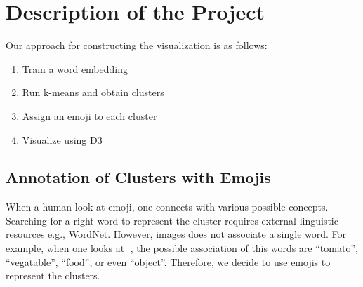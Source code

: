 \section{Description of the Project}
Our approach for constructing the visualization is as follows:
\begin{enumerate}
 \item Train a word embedding
 \item Run k-means and obtain clusters
 \item Assign an emoji to each cluster
 \item Visualize using D3
\end{enumerate}

\subsection{Annotation of Clusters with Emojis}
When a human look at emoji, one connects with various possible concepts. 
Searching for a right word to represent the cluster requires external linguistic resources e.g., WordNet. 
However, images does not associate a single word. 
For example, when one looks at 🍅, the possible association of this words are ``tomato'', ``vegatable'', ``food'', or even ``object''. 
Therefore, we decide to use emojis to represent the clusters. 
